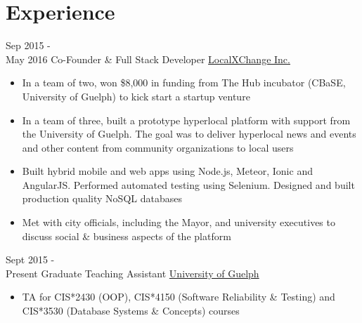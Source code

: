 \documentclass[letterpaper]{twentysecondcv} %
\begin{document}
\section{Experience}

\begin{twenty} %
	\twentyitem
    	{Sep 2015 - \\May 2016}
        {Co-Founder \& Full Stack Developer}
        {\href{http://www.localxchange.ca/}{LocalXChange Inc.}}
        {}
        {
        {\begin{itemize}
        \item In a team of two, won \$8,000 in funding from The Hub incubator (CBaSE, University of Guelph) to kick start a startup venture
        \item In a team of three, built a prototype hyperlocal platform with support from the University of Guelph. The goal was to deliver hyperlocal news and events and other content from community organizations to local users
        \item Built hybrid mobile and web apps using Node.js, Meteor, Ionic and AngularJS. Performed automated testing using Selenium. Designed and built production quality NoSQL databases
        \item Met with city officials, including the Mayor, and university executives to discuss social \& business aspects of the platform 
    \end{itemize}}
        }
        
    \twentyitem
   		{Sept 2015 - \\ Present}
        {Graduate Teaching Assistant}
        {\href{http://www.uoguelph.ca}{University of Guelph}}
        {}
        {
        {\begin{itemize}
        \item TA for CIS*2430 (OOP), CIS*4150 (Software Reliability \& Testing) and CIS*3530 (Database Systems \& Concepts) courses
    \end{itemize}}
        }
        

\end{twenty}
\end{document}

